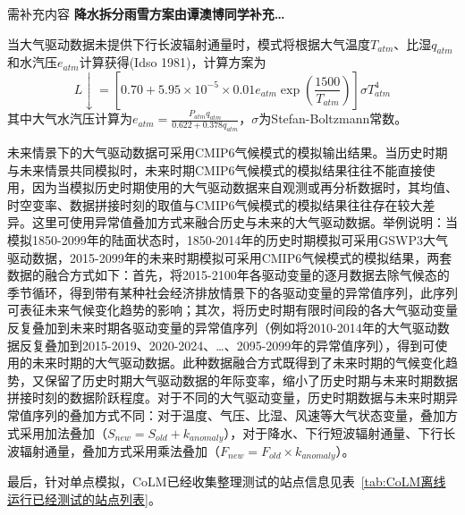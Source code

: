 \begin{mymdframed}{需补充内容}
\textbf{\color{red}降水拆分雨雪方案由谭澳博同学补充…}
\end{mymdframed}

当大气驱动数据未提供下行长波辐射通量时，模式将根据大气温度$T_{atm}$、比湿$q_{atm}$和水汽压$e_{atm}$计算获得(Idso 1981)，计算方案为
\begin{equation}\label{L_downarrow}
L \downarrow=\left[0.70+5.95 \times 10^{-5} \times 0.01 e_{a t m} \exp \left(\frac{1500}{T_{a t m}}\right)\right] \sigma T_{a t m}^{4}
\end{equation}
其中大气水汽压计算为$e_{a t m}=\frac{P_{a t m} q_{a t m}}{0.622+0.378 q_{a t m}}$，$\sigma$为Stefan-Boltzmann常数。

未来情景下的大气驱动数据可采用CMIP6气候模式的模拟输出结果。当历史时期与未来情景共同模拟时，未来时期CMIP6气候模式的模拟结果往往不能直接使用，因为当模拟历史时期使用的大气驱动数据来自观测或再分析数据时，其均值、时空变率、数据拼接时刻的取值与CMIP6气候模式的模拟结果往往存在较大差异。这里可使用异常值叠加方式来融合历史与未来的大气驱动数据。举例说明：当模拟1850-2099年的陆面状态时，1850-2014年的历史时期模拟可采用GSWP3大气驱动数据，2015-2099年的未来时期模拟可采用CMIP6气候模式的模拟结果，两套数据的融合方式如下：首先，将2015-2100年各驱动变量的逐月数据去除气候态的季节循环，得到带有某种社会经济排放情景下的各驱动变量的异常值序列，此序列可表征未来气候变化趋势的影响；其次，将历史时期有限时间段的各大气驱动变量反复叠加到未来时期各驱动变量的异常值序列（例如将2010-2014年的大气驱动数据反复叠加到2015-2019、2020-2024、…、2095-2099年的异常值序列），得到可使用的未来时期的大气驱动数据。此种数据融合方式既得到了未来时期的气候变化趋势，又保留了历史时期大气驱动数据的年际变率，缩小了历史时期与未来时期数据拼接时刻的数据阶跃程度。对于不同的大气驱动变量，历史时期数据与未来时期异常值序列的叠加方式不同：对于温度、气压、比湿、风速等大气状态变量，叠加方式采用加法叠加（$S_{new}=S_{old}+k_{anomaly}$），对于降水、下行短波辐射通量、下行长波辐射通量，叠加方式采用乘法叠加（$F_{new}=F_{old}\times k_{anomaly}$）。


最后，针对单点模拟，CoLM已经收集整理测试的站点信息见表~\ref{tab:CoLM离线运行已经测试的站点列表}。

